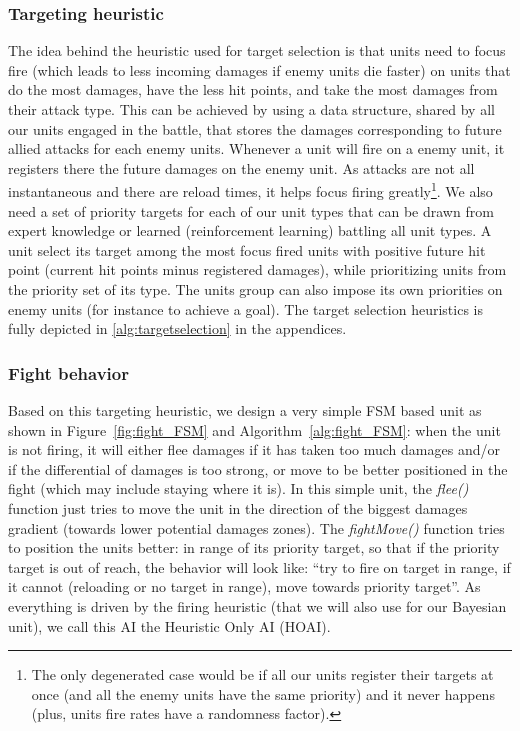 \subsubsection{Targeting heuristic}
The idea behind the heuristic used for target selection is that units need to focus fire (which leads to less incoming damages if enemy units die faster) on units that do the most damages, have the less hit points, and take the most damages from their attack type. This can be achieved by using a data structure, shared by all our units engaged in the battle, that stores the damages corresponding to future allied attacks for each enemy units. Whenever a unit will fire on a enemy unit, it registers there the future damages on the enemy unit. As attacks are not all instantaneous and there are reload times, it helps focus firing greatly\footnote{The only degenerated case would be if all our units register their targets at once (and all the enemy units have the same priority) and it never happens (plus, units fire rates have a randomness factor).}. 
We also need a set of priority targets for each of our unit types that can be drawn from expert knowledge or learned (reinforcement learning) battling all unit types. A unit select its target among the most focus fired units with positive future hit point (current hit points minus registered damages), while prioritizing units from the priority set of its type. The units group can also impose its own priorities on enemy units (for instance to achieve a goal). The target selection heuristics is fully depicted in \ref{alg:targetselection} in the appendices.

\subsubsection{Fight behavior}
\label{sec:HOAI}
Based on this targeting heuristic, we design a very simple FSM based unit as shown in Figure~\ref{fig:fight_FSM} and Algorithm~\ref{alg:fight_FSM}: when the unit is not firing, it will either flee damages if it has taken too much damages and/or if the differential of damages is too strong, or move to be better positioned in the fight (which may include staying where it is). In this simple unit, the \textit{flee()} function just tries to move the unit in the direction of the biggest damages gradient (towards lower potential damages zones). The \textit{fightMove()} function tries to position the units better: in range of its priority target, so that if the priority target is out of reach, the behavior will look like: ``try to fire on target in range, if it cannot (reloading or no target in range), move towards priority target''. As everything is driven by the firing heuristic (that we will also use for our Bayesian unit), we call this AI the Heuristic Only AI (HOAI).

